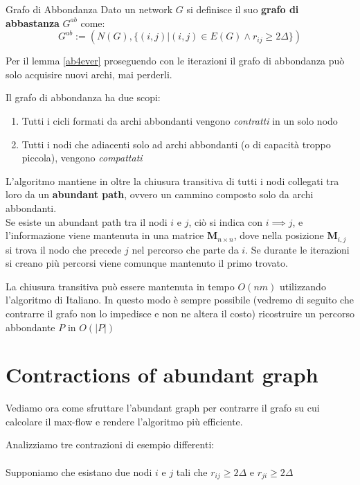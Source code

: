 \documentclass[a4paper, 11pt]{report}
\begin{document}
\begin{definition}{Grafo di Abbondanza}{}
    Dato un network $G$ si definisce il suo \textbf{grafo di abbastanza} $G^{ab}$ come: 
    \[G^{ab} := (N(G), \{(i,j)| (i,j)\in E(G)\land r_{ij}\ge 2\Delta\})\]
\end{definition}
\begin{obs}{}{}
    Per il lemma \ref{ab4ever} proseguendo con le iterazioni il grafo di abbondanza può solo acquisire nuovi archi, mai perderli.
\end{obs}

Il grafo di abbondanza ha due scopi: 
\begin{enumerate}
    \item Tutti i cicli formati da archi abbondanti vengono \textit{contratti} in un solo nodo
    \item Tutti i nodi che adiacenti solo ad archi abbondanti (o di capacità troppo piccola), vengono \textit{compattati}
\end{enumerate}
L'algoritmo mantiene in oltre la chiusura transitiva di tutti i nodi collegati tra loro da un \textbf{abundant path}, ovvero un cammino composto solo da archi abbondanti. \\
Se esiste un abundant path tra il nodi $i$ e $j$, ciò si indica con $i\implies j$, e l'informazione viene mantenuta in una matrice \textbf{M}$_{n\times n}$, dove nella posizione 
\textbf{M}$_{i,j}$ si trova il nodo che precede $j$ nel percorso che parte da $i$. Se durante le iterazioni si creano più percorsi viene comunque mantenuto il primo trovato.

La chiusura transitiva può essere mantenuta in tempo $O(nm)$ utilizzando l'algoritmo di Italiano. 
In questo modo è sempre possibile (vedremo di seguito che contrarre il grafo non lo impedisce e non ne altera il costo) ricostruire un percorso abbondante $P$ in $O(|P|)$
\newpage
\section{Contractions of abundant graph}
Vediamo ora come sfruttare l'abundant graph per contrarre il grafo su cui calcolare il max-flow e rendere l'algoritmo più efficiente.

Analizziamo tre contrazioni di esempio differenti:\\
\\
Supponiamo che esistano due nodi $i$ e $j$ tali che $r_{ij} \ge 2\Delta$ e $r_{ji} \ge 2\Delta$
\end{document}
